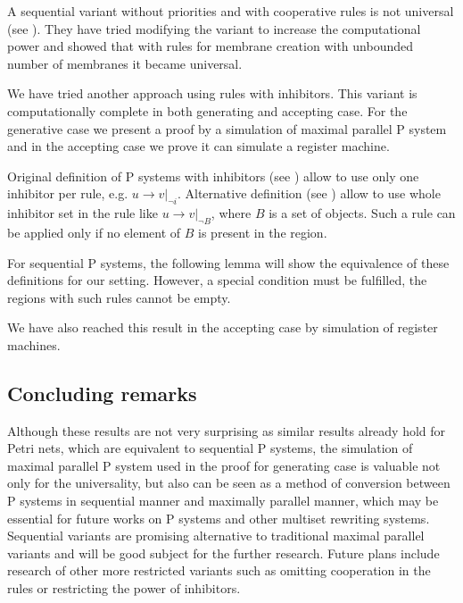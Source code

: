 A sequential variant without priorities and with cooperative rules is not universal (see \cite{Ibarra04dang}). They have tried modifying the variant to increase the computational power and showed that with rules for membrane creation with unbounded number of membranes it became universal.

We have tried another approach using rules with inhibitors. This variant is computationally complete in both generating and accepting case. For the generative case we present a proof by a simulation of maximal parallel P system and in the accepting case we prove it can simulate a register machine.

Original definition of P systems with inhibitors (see \cite{Ionescu:jucs_10_5:on_p_systems_with}) allow to use only one inhibitor per rule, e.g. $u\rightarrow v|_{\neg i}$. Alternative definition (see \cite{Agrigoroaiei:2010:Dissolution}) allow to use whole inhibitor set in the rule like $u\rightarrow v|_{\neg B}$, where $B$ is a set of objects. Such a rule can be applied only if no element of $B$ is present in the region.

For sequential P systems, the following lemma will show the equivalence of these definitions for our setting. However, a special condition must be fulfilled, the regions with such rules cannot be empty.



We have also reached this result in the accepting case by simulation of register machines.



\subsection{Concluding remarks} %
\label{sub:concluding_remarks_of_inhibitors}

Although these results are not very surprising as similar results already hold for Petri nets, which are equivalent to sequential P systems, the simulation of maximal parallel P system used in the proof for generating case is valuable not only for the universality, but also can be seen as a method of conversion between P systems in sequential manner and maximally parallel manner, which may be essential for future works on P systems and other multiset rewriting systems. Sequential variants are promising alternative to traditional maximal parallel variants and will be good subject for the further research. Future plans include research of other more restricted variants such as omitting cooperation in the rules or restricting the power of inhibitors.

